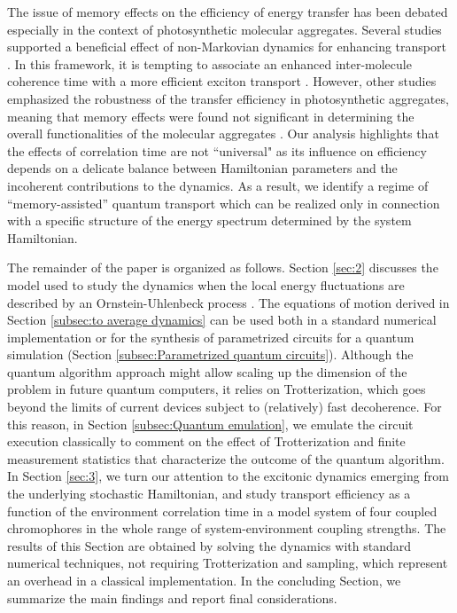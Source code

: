 \documentclass[12pt, amsmath, amssymb, graphicx]{iopart}
\begin{document}
The issue of memory effects on the efficiency of energy transfer has been debated especially in the context of photosynthetic molecular aggregates. Several studies supported a beneficial effect of non-Markovian dynamics for enhancing transport \cite{Fujita2012, Cui2021, Moreira2020, Rebentrost2009a}.
In this framework, it is tempting to associate an enhanced inter-molecule coherence time with a more efficient exciton transport \cite{Ishizaki2009a}.
However, other studies emphasized the robustness of the transfer efficiency in photosynthetic aggregates, meaning that memory effects were found not significant in determining the overall functionalities of the molecular aggregates \cite{Jesenko2013, Mujica-Martinez2013}. Our analysis highlights that the effects of correlation time are not ``universal" as its influence on efficiency depends on a delicate balance between Hamiltonian parameters and the incoherent contributions to the dynamics.
As a result, we identify a regime of ``memory-assisted” quantum transport which can be realized only in connection with a specific structure of the energy spectrum determined by the system Hamiltonian.

The remainder of the paper is organized as follows. Section \ref{sec:2} discusses the model used to study the dynamics when the local energy fluctuations are described by an Ornstein-Uhlenbeck process \cite{Gillespie1996}.
The equations of motion derived in Section \ref{subsec:to average dynamics} can be used both in a standard numerical implementation or for the synthesis of parametrized circuits for a quantum simulation (Section \ref{subsec:Parametrized quantum circuits}).
Although the quantum algorithm approach might allow scaling up the dimension of the problem in future quantum computers, it relies on Trotterization, which goes beyond the limits of current devices subject to (relatively) fast decoherence.
For this reason, in Section \ref{subsec:Quantum emulation}, we emulate the circuit execution classically to comment on the effect of Trotterization and finite measurement statistics that characterize the outcome of the quantum algorithm.
In Section \ref{sec:3}, we turn our attention to the excitonic dynamics emerging from the underlying stochastic Hamiltonian, and study transport efficiency as a function of the environment correlation time in a model system of four coupled chromophores in the whole range of system-environment coupling strengths.
The results of this Section are obtained by solving the dynamics with standard numerical techniques, not requiring Trotterization and sampling, which represent an overhead in a classical implementation.
In the concluding Section, we summarize the main findings and report final considerations.
\end{document}
